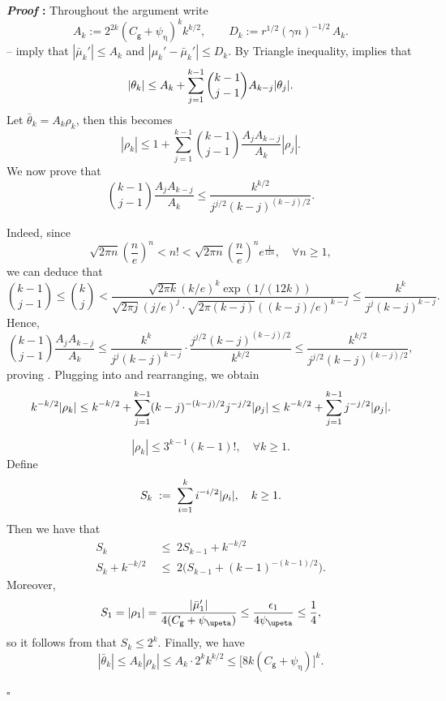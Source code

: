 \documentclass{article}
\def\eps{{\epsilon}}
\renewenvironment{proof}{\noindent\textbf{\textit{Proof }:}}{\hfill$\square$}
\begin{document}
\begin{proof}
Throughout the argument write
\[
  A_k:=2^{2k}(C_{\mathsf g}+\psi_{\upeta})^k k^{k/2},
  \qquad
  D_k:=r^{1/2}(\gamma n)^{-1/2}\,A_k.
\]
– imply that $|\bar\mu_k'|\le A_k$
and $|\mu_k'-\bar\mu_k'|\le D_k$. By Triangle inequality,  implies that
\begin{equation}
    \notag
    |\theta_k| \leq A_k + \sum_{j=1}^{k-1}\binom{k-1}{j-1}A_{k-j} |\theta_j|.
\end{equation}
Let $\bar{\theta}_k = A_k \rho_k$, then this becomes
\begin{equation}
    \label{eq:rho-k-recursive}
    |\rho_k| \leq 1 + \sum_{j=1}^{k-1}\binom{k-1}{j-1} \frac{A_jA_{k-j}}{A_k} |\rho_j|.
\end{equation}
We now prove that
\begin{equation}
    \label{eq:Ak-ineq}
    \binom{k-1}{j-1}\frac{A_jA_{k-j}}{A_k} \leq \frac{k^{k/2}}{j^{j/2}(k-j)^{(k-j)/2}}.
\end{equation}

Indeed, since
\[
\sqrt{2\pi n} \left(\frac{n}{e}\right)^n < n! < \sqrt{2\pi n} \left(\frac{n}{e}\right)^n e^{\frac{1}{12n}},\quad\forall n\geq 1,
\]
we can deduce that
\[
\binom{k-1}{j-1}\leq\binom{k}{j} < \frac{\sqrt{2\pi k}(k/e)^k \exp(1/(12k))}{\sqrt{2\pi j}(j/e)^j\cdot \sqrt{2\pi (k-j)}((k-j)/e)^{k-j}} \leq \frac{k^k}{j^j(k-j)^{k-j}}.
\]
Hence,
\[
\binom{k-1}{j-1}\frac{A_jA_{k-j}}{A_k} \leq \frac{k^k}{j^j(k-j)^{k-j}} \cdot \frac{j^{j/2}(k-j)^{(k-j)/2}}{k^{k/2}} \leq \frac{k^{k/2}}{j^{j/2}(k-j)^{(k-j)/2}},
\]
proving . Plugging into  and rearranging, we obtain
\begin{equation}
    \notag
    k^{-k/2}|\rho_k| \leq k^{-k/2} + \sum_{j=1}^{k-1}(k-j)^{-(k-j)/2}j^{-j/2}|\rho_j| \leq k^{-k/2} + \sum_{j=1}^{k-1}j^{-j/2}|\rho_j|. 
\end{equation}

\begin{equation}
    \label{eq:rho-k-bound}
    |\rho_k| \leq 3^{k-1}(k-1)!,\quad \forall k \geq 1.
\end{equation}
Define 
\begin{equation}
    \notag
    S_k \;:=\; \sum_{i=1}^k i^{-i/2} |\rho_i|, \quad k\geq 1.
\end{equation}
Then we have that
\begin{equation}
    \label{eq:Sk-recursion}
    \begin{aligned}
        S_k \; &\leq \; 2S_{k-1} + k^{-k/2} \\
        S_k + k^{-k/2} \; &\leq \; 2\big(S_{k-1} + (k-1)^{-(k-1)/2}\big).
    \end{aligned}
\end{equation}
Moreover, 
\begin{equation}
    \notag
    S_1 = |\rho_1| = \frac{|\bar{\mu}_1'|}{4(C_{\mathsf{g}}+\psi_{\upeta})} \leq \frac{\eps_1}{4\psi_{\upeta}} \leq \frac{1}{4},
\end{equation}
so it follows from  that $S_k \leq 2^k$. Finally, we have
\[
|\bar{\theta}_k| \leq A_k |\rho_k| \leq A_k \cdot 2^k k^{k/2} \leq \big[8k(C_{\mathsf{g}}+\psi_{\upeta})\big]^k.
\]



\end{proof}
\end{document}
